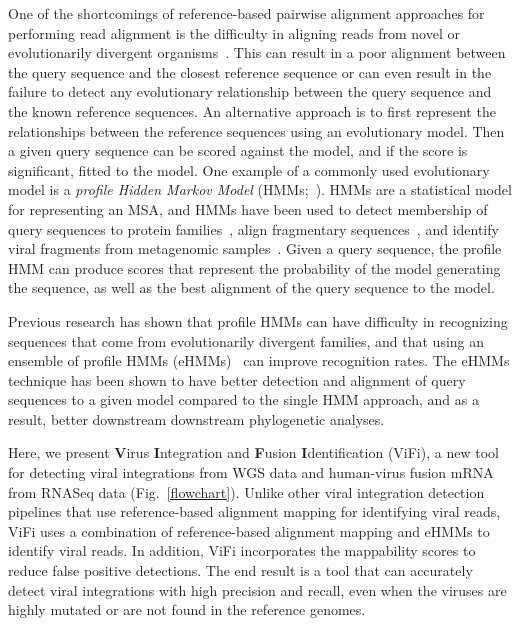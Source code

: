 \documentclass[12pt]{article}
\begin{document}
One of the shortcomings of reference-based pairwise alignment approaches for performing read alignment is the difficulty in aligning reads from novel or evolutionarily divergent organisms~\cite{Brenner1998,Park1998}.  This can result in a poor alignment between the query sequence and the closest reference sequence or can even result in the failure to detect any evolutionary relationship between the query sequence and the known reference sequences.  An alternative approach is to first represent the relationships between the reference sequences using an evolutionary model.  Then a given query sequence can be scored against the model, and if the score is significant, fitted to the model.  One example of a commonly used evolutionary model is a \emph{profile Hidden Markov Model} (HMMs;~\cite{Eddy1998}). HMMs are a statistical model for representing an MSA, and HMMs have been used to detect membership of query sequences to protein families~\cite{Finn2010}, align fragmentary sequences~\cite{Eddy1998}, and identify viral fragments from metagenomic samples~\cite{Skewes-Cox2014}.  Given a query sequence, the profile HMM can produce scores that represent the probability of the model generating the sequence, as well as the best alignment of the query sequence to the model.

Previous research has shown that profile HMMs can have difficulty in recognizing sequences that come from evolutionarily divergent families, and that using an ensemble of profile HMMs (eHMMs)~\cite{Mirarab2012,Nguyen2014,Nguyen2015,Nguyen2016_hippi} can improve recognition rates.  The eHMMs technique has been shown to have better detection and alignment of query sequences to a given model compared to the single HMM approach, and as a result, better downstream downstream phylogenetic analyses. 

Here, we present \textbf{V}irus \textbf{I}ntegration and \textbf{F}usion \textbf{I}dentification (ViFi), a new tool for detecting viral integrations from WGS data and human-virus fusion mRNA from RNASeq data (Fig.~\ref{flowchart}).  Unlike other viral integration detection pipelines that use reference-based alignment mapping for identifying viral reads, ViFi uses a combination of reference-based alignment mapping and eHMMs to identify viral reads.  In addition, ViFi incorporates the mappability scores to reduce false positive detections.  The end result is a tool that can accurately detect viral integrations with high precision and recall, even when the viruses are highly mutated or are not found in the reference genomes.  
\end{document}
